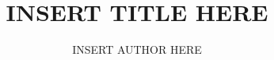 \documentclass{article}
\title{INSERT TITLE HERE}
\author{INSERT AUTHOR HERE}
\begin{document}
\maketitle

\section{}
\end{document}
